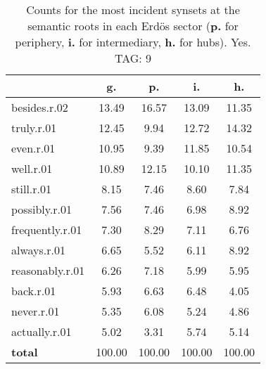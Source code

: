 \begin{table}[h!]
\begin{center}
\begin{tabular}{| l | c | c | c | c |}\hline
 & g. & p. & i. & h. \\\hline
besides.r.02 & 13.49  & 16.57  & 13.09  & 11.35 \\\hline
truly.r.01 & 12.45  & 9.94  & 12.72  & 14.32 \\\hline
even.r.01 & 10.95  & 9.39  & 11.85  & 10.54 \\\hline
well.r.01 & 10.89  & 12.15  & 10.10  & 11.35 \\\hline
still.r.01 & 8.15  & 7.46  & 8.60  & 7.84 \\\hline
possibly.r.01 & 7.56  & 7.46  & 6.98  & 8.92 \\\hline
frequently.r.01 & 7.30  & 8.29  & 7.11  & 6.76 \\\hline
always.r.01 & 6.65  & 5.52  & 6.11  & 8.92 \\\hline
reasonably.r.01 & 6.26  & 7.18  & 5.99  & 5.95 \\\hline
back.r.01 & 5.93  & 6.63  & 6.48  & 4.05 \\\hline
never.r.01 & 5.35  & 6.08  & 5.24  & 4.86 \\\hline
actually.r.01 & 5.02  & 3.31  & 5.74  & 5.14 \\\hline
{{\bf total}} & 100.00  & 100.00  & 100.00  & 100.00 \\\hline
\end{tabular}
\caption{Counts for the most incident synsets at the semantic roots in each Erd\"os sector ({\bf p.} for periphery, {\bf i.} for intermediary, {\bf h.} for hubs). Yes. TAG: 9}
\end{center}
\end{table}